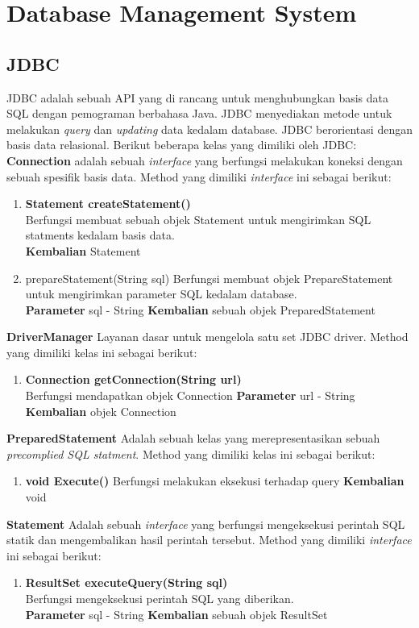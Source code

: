 \section{Database Management System}
\subsection{JDBC}
JDBC adalah sebuah API yang di rancang untuk menghubungkan basis data SQL dengan pemograman berbahasa Java. JDBC menyediakan metode untuk melakukan \textit{query} dan \textit{updating} data kedalam database. JDBC berorientasi dengan basis data relasional. Berikut beberapa kelas yang dimiliki oleh JDBC:\\
\textbf{Connection} adalah sebuah \textit{interface} yang berfungsi melakukan koneksi dengan sebuah spesifik basis data. Method yang dimiliki \textit{interface} ini sebagai berikut:
\begin{enumerate}
	\item \textbf{Statement createStatement()}\\
	Berfungsi membuat sebuah objek Statement untuk mengirimkan SQL statments kedalam basis data.\\
	\textbf{Kembalian} Statement
	\item prepareStatement(String sql)
	Berfungsi membuat objek PrepareStatement untuk mengirimkan parameter SQL kedalam database.\\
	\textbf{Parameter} sql - String
	\textbf{Kembalian} sebuah objek PreparedStatement
\end{enumerate}
\textbf{DriverManager} Layanan dasar untuk mengelola satu set JDBC driver. Method yang dimiliki kelas ini sebagai berikut:
\begin{enumerate}
	\item \textbf{Connection getConnection(String url)}\\
	Berfungsi mendapatkan objek Connection
	\textbf{Parameter} url - String\\
	\textbf{Kembalian} objek Connection
\end{enumerate}
\textbf{PreparedStatement} Adalah sebuah kelas yang merepresentasikan sebuah \textit{precomplied SQL statment}. Method yang dimiliki kelas ini sebagai berikut:
\begin{enumerate}
\item \textbf{void Execute()}
Berfungsi melakukan eksekusi terhadap query
\textbf{Kembalian} void
\end{enumerate}
\textbf{Statement} Adalah sebuah \textit{interface} yang berfungsi mengeksekusi perintah SQL statik dan mengembalikan hasil perintah tersebut. Method yang dimiliki \textit{interface} ini sebagai berikut:
\begin{enumerate}
	\item \textbf{ResultSet executeQuery(String sql)}\\
	Berfungsi mengeksekusi perintah SQL yang diberikan.\\
	\textbf{Parameter} sql - String
	\textbf{Kembalian} sebuah objek ResultSet
\end{enumerate}